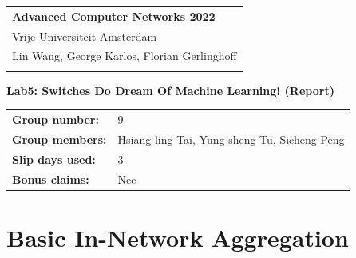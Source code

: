 \documentclass[a4paper,11pt]{article}
\begin{document}
\thispagestyle{empty} 

\begin{tabular}{@{}p{15.5cm}} 
{\bf Advanced Computer Networks 2022} \\
Vrije Universiteit Amsterdam \\
Lin Wang, George Karlos, Florian Gerlinghoff \\
\hline 
\\
\end{tabular} 

\vspace*{0.3cm} 

{\Large \bf Lab5: Switches Do Dream Of Machine Learning! (Report)} 

\vspace*{0.3cm} 


\begin{tcolorbox}[sharp corners, colback=blue!5!white]
\begin{tabular}{@{}ll}
\textbf{Group number:} & 9 \\
\textbf{Group members:} & Hsiang-ling Tai, Yung-sheng Tu, Sicheng Peng \\
\textbf{Slip days used:} & 3 \\
\textbf{Bonus claims:} & Nee \\
\end{tabular}
\end{tcolorbox}

\vspace{0.4cm}

\section{Basic In-Network Aggregation}
\end{document}
